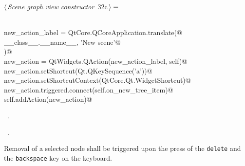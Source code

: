 \documentclass[
    a4paper,      %
    10pt,         %
    openright,    %
    notitlepage,  %
    parskip=half, %
]{scrreprt}       %
\theoremstyle{definition}                    %
\begin{document}
\begin{flushleft} \small
\begin{minipage}{\linewidth}\label{scrap38}\raggedright\small
{} $\langle\,${\itshape Scene graph view constructor}\nobreak\ {\footnotesize {32c}}$\,\rangle\equiv$
\vspace{-1exm}
\begin{list}{}{} \item
\mbox{}\lstinline@@\\
\mbox{}\lstinline@    new_action_label = QtCore.QCoreApplication.translate(@\\
\mbox{}\lstinline@        __class__.__name__, 'New scene'@\\
\mbox{}\lstinline@    )@\\
\mbox{}\lstinline@    new_action = QtWidgets.QAction(new_action_label, self)@\\
\mbox{}\lstinline@    new_action.setShortcut(Qt.QKeySequence('a'))@\\
\mbox{}\lstinline@    new_action.setShortcutContext(QtCore.Qt.WidgetShortcut)@\\
\mbox{}\lstinline@    new_action.triggered.connect(self.on_new_tree_item)@\\
\mbox{}\lstinline@    self.addAction(new_action)@\\
\mbox{}\lstinline@@{\NWsep}
\end{list}
\vspace{-1.5ex}
\footnotesize
\begin{list}{}{\setlength{\itemsep}{-\parsep}\setlength{\itemindent}{-\leftmargin}}
\item \NWtxtMacroDefBy\ .
\item \NWtxtMacroRefIn\ .

\item{}
\end{list}
\end{minipage}\vspace{4ex}
\end{flushleft}
Removal of a selected node shall be triggered upon the press of the
\verb+delete+ and the \verb+backspace+ key on the keyboard.
\end{document}
